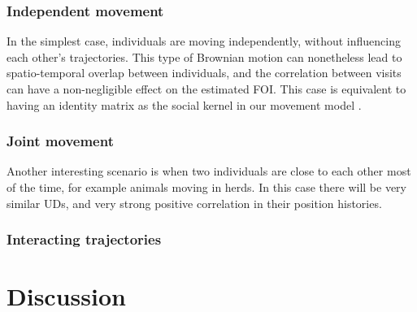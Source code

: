 \documentclass[letterpaper]{article}
\begin{document}
\subsubsection*{Independent movement}

In the simplest case, individuals are moving independently, without influencing each other's trajectories. This type of Brownian motion can nonetheless lead to spatio-temporal overlap between individuals, and the correlation between visits can have a non-negligible effect on the estimated FOI. 
This case is equivalent to having an identity matrix as the social kernel in our movement model \citep{Scharf2018}.

\subsubsection*{Joint movement}

Another interesting scenario is when two individuals are close to each other most of the time, for example animals moving in herds. In this case there will be very similar UDs, and very strong positive correlation in their position histories. 

\subsubsection*{Interacting trajectories}
 
\section*{Discussion}



\end{document}
